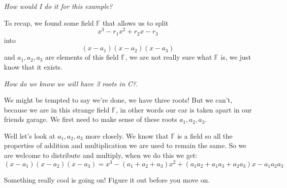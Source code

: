 \documentclass[12pt]{article}
\begin{document}
\emph{How would I do it for this example?} 




To recap, we found some field $\mathbb{F}$ that allows us to split $$x^3 -r_1 x^2 +r_2 x - r_3$$ into $$(x-a_1)(x-a_2)(x-a_3)$$ and $a_1, a_2, a_3$ are elements of this field $\mathbb{F}$, we are not really sure what $\mathbb{F}$ is, we just know that it exists.

\emph{How do we know we will have 3 roots in C?}.

We might be tempted to say we're done, we have three roots!  But we can't, because we are in this strange field $\mathbb{F}$, in other words our car is taken apart in our friends garage.  We first need to make sense of these roots $a_1, a_2, a_3$.


Well let's look at $a_1, a_2, a_3$ more closely.  We know that $\mathbb{F}$ is a field so all the properties of addition and multiplication we are used to remain the same.  So we are welcome to distribute and multiply, when we do this we get:
$$ (x-a_1)(x-a_2)(x-a_3) = x^3 -(a_1+a_2+a_3)x^2+(a_1a_2 +a_1a_3 +a_2a_3)x -a_1a_2a_3$$

Something really cool is going on!  Figure it out before you move on.
\end{document}
